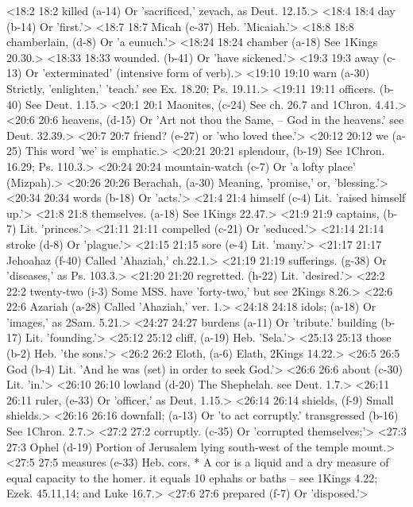 <18:2 18:2  killed (a-14)  Or 'sacrificed,' zevach, as Deut. 12.15.>
<18:4 18:4  day (b-14)  Or 'first.'>
<18:7 18:7  Micah (c-37)  Heb. 'Micaiah.'>
<18:8 18:8  chamberlain, (d-8)  Or 'a eunuch.'>
<18:24 18:24  chamber (a-18)  See 1Kings 20.30.>
<18:33 18:33  wounded. (b-41)  Or 'have sickened.'>
<19:3 19:3  away (c-13)  Or 'exterminated' (intensive form of verb).>
<19:10 19:10  warn (a-30)  Strictly, 'enlighten,' 'teach.' see Ex. 18.20; Ps. 19.11.>
<19:11 19:11  officers. (b-40)  See Deut. 1.15.>
<20:1 20:1  Maonites, (c-24)  See ch. 26.7 and 1Chron. 4.41.>
<20:6 20:6  heavens, (d-15)  Or 'Art not thou the Same, -- God in the heavens.' see Deut. 32.39.>
<20:7 20:7  friend? (e-27)  or 'who loved thee.'>
<20:12 20:12  we (a-25)  This word 'we' is emphatic.>
<20:21 20:21  splendour, (b-19)  See 1Chron. 16.29; Ps. 110.3.>
<20:24 20:24  mountain-watch (c-7)  Or 'a lofty place' (Mizpah).>
<20:26 20:26  Berachah, (a-30)  Meaning, 'promise,' or, 'blessing.'>
<20:34 20:34  words (b-18)  Or 'acts.'>
<21:4 21:4  himself (c-4)  Lit. 'raised himself up.'>
<21:8 21:8  themselves. (a-18)  See 1Kings 22.47.>
<21:9 21:9  captains, (b-7)  Lit. 'princes.'>
<21:11 21:11  compelled (c-21)  Or 'seduced.'>
<21:14 21:14  stroke (d-8)  Or 'plague.'>
<21:15 21:15  sore (e-4)  Lit. 'many.'>
<21:17 21:17  Jehoahaz (f-40)  Called 'Ahaziah,' ch.22.1.>
<21:19 21:19  sufferings. (g-38)  Or 'diseases,' as Ps. 103.3.>
<21:20 21:20  regretted. (h-22)  Lit. 'desired.'>
<22:2 22:2  twenty-two (i-3)  Some MSS. have 'forty-two,' but see 2Kings 8.26.>
<22:6 22:6  Azariah (a-28)  Called 'Ahaziah,' ver. 1.>
<24:18 24:18  idols; (a-18)  Or 'images,' as 2Sam. 5.21.>
<24:27 24:27  burdens (a-11)  Or 'tribute.'
  building (b-17)  Lit. 'founding.'>
<25:12 25:12  cliff, (a-19)  Heb. 'Sela.'>
<25:13 25:13  those (b-2)  Heb. 'the sons.'>
<26:2 26:2  Eloth, (a-6)  Elath, 2Kings 14.22.>
<26:5 26:5  God (b-4)  Lit. 'And he was (set) in order to seek God.'>
<26:6 26:6  about (c-30)  Lit. 'in.'>
<26:10 26:10  lowland (d-20)  The Shephelah. see Deut. 1.7.>
<26:11 26:11  ruler, (e-33)  Or 'officer,' as Deut. 1.15.>
<26:14 26:14  shields, (f-9)  Small shields.>
<26:16 26:16  downfall; (a-13)  Or 'to act corruptly.'
  transgressed (b-16)  See 1Chron. 2.7.>
<27:2 27:2  corruptly. (c-35)  Or 'corrupted themselves;'>
<27:3 27:3  Ophel (d-19)  Portion of Jerusalem lying south-west of the temple mount.>
<27:5 27:5  measures (e-33)  Heb. cors. * A cor is a liquid and a dry measure of equal  capacity to the homer. it equals 10 ephahs or baths -- see  1Kings 4.22; Ezek. 45.11,14; and Luke 16.7.>
<27:6 27:6  prepared (f-7)  Or 'disposed.'>
